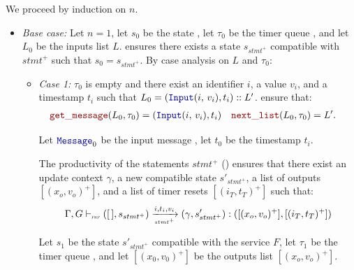 \begin{skippableproof}
    We proceed by induction on $n$.
    \begin{itemize}
        \item \textit{Base case:} Let $n = 1$, let $s_0$ be the state , let $\tau_0$ be
              the timer queue , and let $L_0$ be the inputs list $L$.
               ensures there exists a state
              $s_{stmt^+}$ compatible with $stmt^+$ such that $s_0 = s_{stmt^+}$.
              By case analysis on $L$ and $\tau_0$:
              \begin{itemize}
                  \item \textit{Case 1:} $\tau_0$ is empty and there exist an identifier $i$, a
                        value $v_i$, and a timestamp $t_i$ such that $L_0 = (\inputMess{i}{v_i},
                            t_i) :: L'$.
                        ensure that:
                        \begin{align*}
                            \getMess{L_0}{\tau_0}  & = (\inputMess{i}{v_i}, t_i) &
                            \nextList{L_0}{\tau_0} & = L'.
                        \end{align*}

                        Let $\mess_0$ be the input message , let $t_0$ be the
                        timestamp $t_i$.

                        The productivity of the statements $stmt^+$ () ensures that there exist an update context
                        $\gamma$, a new compatible state $s'_{stmt^+}$, a list of outputs $[(x_o,
                                    v_o)^+]$, and a list of timer resets $[(i_T, t_T)^+]$ such that:
                        \begin{equation*}
                            \Gamma, G \vdash_{\textnormal{\tiny\textsc{frp}}} ([\,], s_{stmt^+}) \xrightarrow[\mbox{\tiny\ensuremath{stmt^+}}]{i, t_i, v_i} (\gamma, s'_{stmt^+}): ([(x_o, v_o)^+], [(i_T, t_T)^+])
                        \end{equation*}

                        Let $s_1$ be the state $s'_{stmt^+}$ compatible with the service $F$, let
                        $\tau_1$ be the timer queue , and let $[(x_0,
                                    v_0)^+]$ be the outputs list $[(x_o, v_o)^+]$.


\end{itemize}
\end{itemize}
\end{skippableproof}
